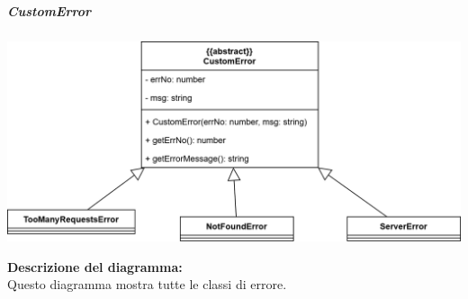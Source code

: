 \subparagraph{CustomError}
\begin{center}
    \includegraphics[scale=0.25]{template/images/uml_front/logic/Error.png}
\end{center}
\textbf{Descrizione del diagramma:}\\
Questo diagramma mostra tutte le classi di errore.
